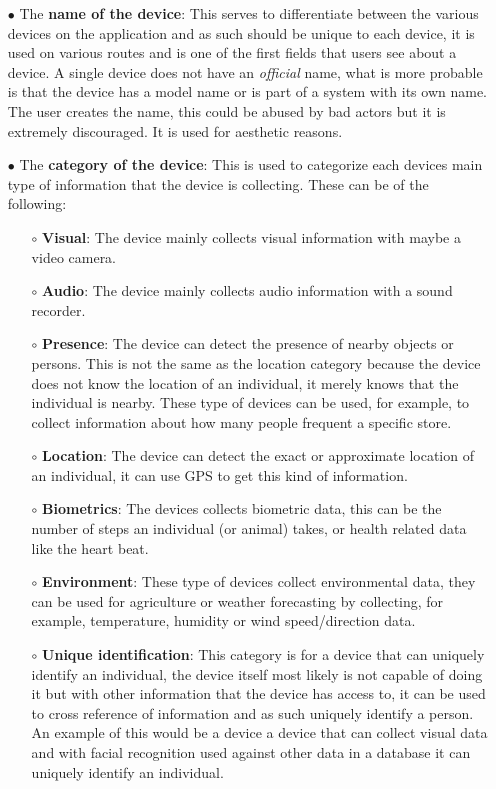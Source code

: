 \begin{itemize}
    \item[$\bullet$]
    The \textbf{name of the device}: This serves to differentiate between the various devices on the application and as such should be unique to each device, it is used on various routes and is one of the first fields that users see about a device. A single device does not have an \textit{official} name, what is more probable is that the device has a model name or is part of a system with its own name. The user creates the name, this could be abused by bad actors but it is extremely discouraged. It is used for aesthetic reasons.
    \item[$\bullet$]
    The \textbf{category of the device}: This is used to categorize each devices main type of information that the device is collecting. These can be of the following:
    \begin{itemize}
        \item[$\circ$] \textbf{Visual}: The device mainly collects visual information with maybe a video camera.
        \item[$\circ$] \textbf{Audio}: The device mainly collects audio information with a sound recorder.
        \item[$\circ$] \textbf{Presence}: The device can detect the presence of nearby objects or persons. This is not the same as the location category because the device does not know the location of an individual, it merely knows that the individual is nearby. These type of devices can be used, for example, to collect information about how many people frequent a specific store.
        \item[$\circ$] \textbf{Location}: The device can detect the exact or approximate location of an individual, it can use GPS to get this kind of information.
        \item[$\circ$] \textbf{Biometrics}: The devices collects biometric data, this can be the number of steps an individual (or animal) takes, or health related data like the heart beat.
        \item[$\circ$] \textbf{Environment}: These type of devices collect environmental data, they can be used for agriculture or weather forecasting by collecting, for example, temperature, humidity or wind speed/direction data.
        \item[$\circ$] \textbf{Unique identification}: This category is for a device that can uniquely identify an individual, the device itself most likely is not capable of doing it but with other information that the device has access to, it can be used to cross reference of information and as such uniquely identify a person. An example of this would be a device a device that can collect visual data and with facial recognition used against other data in a database it can uniquely identify an individual.

\end{itemize}
\end{itemize}
